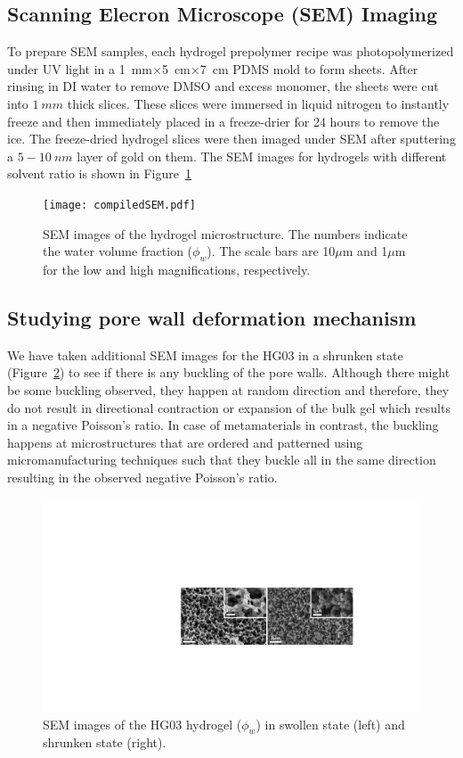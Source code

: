 \subsection{Scanning Elecron Microscope (SEM) Imaging}
To prepare SEM samples, each hydrogel prepolymer recipe was photopolymerized under UV light in a 1~mm$\times$5~cm$\times$7~cm PDMS mold to form sheets. After rinsing in DI water to remove DMSO and excess monomer, the sheets were cut into $1~mm$ thick slices. These slices were immersed in liquid nitrogen to instantly freeze and then immediately placed in a freeze-drier for 24 hours to remove the ice. The freeze-dried hydrogel slices were then imaged under SEM after sputtering a $5-10~nm$ layer of gold on them. The SEM images for hydrogels with different solvent ratio is shown in Figure~\ref{fig:compiledSEM}

\begin{figure}[!th]
      \centering
      \texttt{[image: compiledSEM.pdf]}
      \caption{SEM images of the hydrogel microstructure. The numbers indicate the water volume fraction ($\phi_w$). The scale bars are 10$\mu$m and 1$\mu$m for the low and high magnifications, respectively.}
      \label{fig:compiledSEM}
\end{figure}

\subsection{Studying pore wall deformation mechanism}
We have taken additional SEM images for the HG03 in a shrunken state (Figure~\ref{fig:poreDeformation}) to see if there is any buckling of the pore walls. Although there might be some buckling observed, they happen at random direction and therefore, they do not result in directional contraction or expansion of the bulk gel which results in a negative Poisson’s ratio. In case of metamaterials in contrast, the buckling happens at microstructures that are ordered and patterned using micromanufacturing techniques such that they buckle all in the same direction resulting in the observed negative Poisson’s ratio.

\begin{figure}[!th]
      \centering
      \includegraphics[width=\textwidth]{poreDeformation.pdf}
      \caption{SEM images of the HG03 hydrogel ($\phi_w$) in swollen state (left) and shrunken state (right).}
      \label{fig:poreDeformation}
\end{figure}

